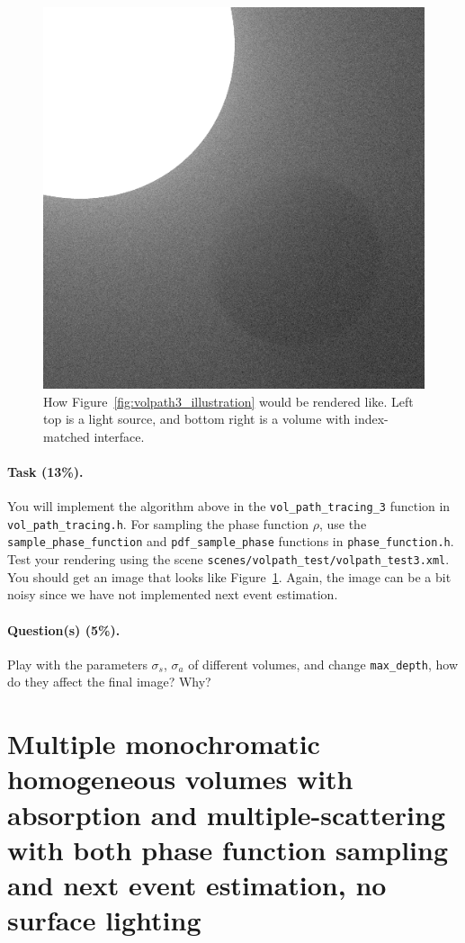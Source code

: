 \begin{figure}
\centering
\includegraphics[width=0.5\linewidth]{imgs/volpath_3.png}
\caption{How Figure~\ref{fig:volpath3_illustration} would be rendered like. Left top is a light source, and bottom right is a volume with index-matched interface.}
\label{fig:volpath3}
\end{figure}

\paragraph{Task (13\%).} You will implement the algorithm above in the \lstinline{vol_path_tracing_3} function in \lstinline{vol_path_tracing.h}. For sampling the phase function $\rho$, use the \lstinline{sample_phase_function} and \lstinline{pdf_sample_phase} functions in \lstinline{phase_function.h}.
Test your rendering using the scene \lstinline{scenes/volpath_test/volpath_test3.xml}. You should get an image that looks like Figure~\ref{fig:volpath3}. Again, the image can be a bit noisy since we have not implemented next event estimation.

\paragraph{Question(s) (5\%).} Play with the parameters $\sigma_s$, $\sigma_a$ of different volumes, and change \lstinline{max_depth}, how do they affect the final image? Why?

\section{Multiple monochromatic homogeneous volumes with absorption and multiple-scattering with both phase function sampling and next event estimation, no surface lighting}

